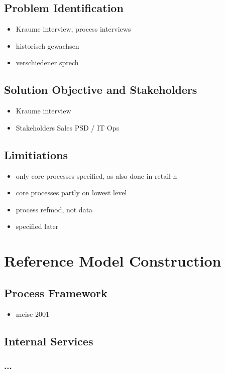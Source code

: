 \section{Problem Identification}
\begin{itemize}
	\item Kraume interview, process interviews
	\item historisch gewachsen
	\item verschiedener sprech
	
\end{itemize}
\section{Solution Objective and Stakeholders}
\begin{itemize}
	\item Kraume interview
	\item Stakeholders
	\subitem Sales
	\subitem PSD / IT
	\subitem Ops
\end{itemize}
\section{Limitiations}
\begin{itemize}
	\item only core processes specified, as also done in retail-h
	\item core processes partly on lowest level
	\item process refmod, not data
	\item specified later
\end{itemize}

\chapter{Reference Model Construction}
	\section{Process Framework}
	\begin{itemize}
		\item meise 2001
	\end{itemize}
	\section{Internal Services}
	\subsection{...}
